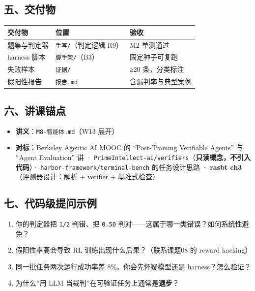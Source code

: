 \documentclass[
  chinese,
  11pt,
]{ctexart}
\newcounter{none} %
\providecommand{\tightlist}{%
  \setlength{\itemsep}{0pt}\setlength{\parskip}{0pt}}
\begin{document}
\subsection{五、交付物}\label{ux4e94ux4ea4ux4ed8ux7269-7}

{\def\LTcaptype{none} %
\begin{longtable}[]{@{}lll@{}}
\toprule\noalign{}
交付物 & 位置 & 验收 \\
\midrule\noalign{}
\endhead
\bottomrule\noalign{}
\endlastfoot
题集与判定器 & \texttt{手写/}（判定逻辑 R9） & M2 单测通过 \\
harness 脚本 & \texttt{脚手架/}（B3） & 固定种子可复跑 \\
失败样本 & \texttt{证据/} & ≥20 条，分类标注 \\
假阳性报告 & \texttt{报告.md} & 含漏判率与典型案例 \\
\end{longtable}
}

\subsection{六、讲课锚点}\label{ux516dux8bb2ux8bfeux951aux70b9-6}

\begin{itemize}
\tightlist
\item
  \textbf{讲义}：\texttt{M8-智能体.md}（W13 展开）
\item
  \textbf{对标}：Berkeley Agentic AI MOOC 的 ``Post-Training Verifiable Agents'' 与 ``Agent Evaluation'' 讲 · \texttt{PrimeIntellect-ai/verifiers}（\textbf{只读概念，不引入代码}）· \texttt{harbor-framework/terminal-bench} 的任务设计思路 · \textbf{rasbt ch3}（评测器设计：解析 + verifier + 基准式检查）
\end{itemize}

\subsection{七、代码级提问示例}\label{ux4e03ux4ee3ux7801ux7ea7ux63d0ux95eeux793aux4f8b-6}

\begin{enumerate}
\def\labelenumi{\arabic{enumi}.}
\tightlist
\item
  你的判定器把 \texttt{1/2} 判错、把 \texttt{0.50} 判对------这属于哪一类错误？如何系统性避免？
\item
  假阳性率高会导致 RL 训练出现什么后果？（联系课题08 的 reward hacking）
\item
  同一批任务两次运行成功率差 8\%。你会先怀疑模型还是 harness？怎么验证？
\item
  为什么''用 LLM 当裁判''在可验证任务上通常是\textbf{退步}？
\end{enumerate}
\end{document}
